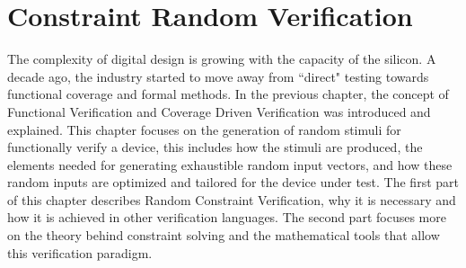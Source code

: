 



\chapter{Constraint Random Verification}\label{constraintrandom}
The complexity of digital design is growing with the capacity of the silicon. A
decade ago, the industry started to move away from ``direct" testing towards
functional coverage and formal methods. In the previous chapter, the concept of
Functional Verification and Coverage Driven Verification was introduced and
explained. This chapter focuses on the generation of random stimuli for
functionally verify a device, this includes how the stimuli are produced, the
elements needed for generating exhaustible random input vectors, and how these
random inputs are optimized and tailored for the device under test. The first
part of this chapter describes Random Constraint Verification, why it is
necessary and how it is achieved in other verification languages. The second
part focuses more on the theory behind constraint solving and the mathematical
tools that allow this verification paradigm.

